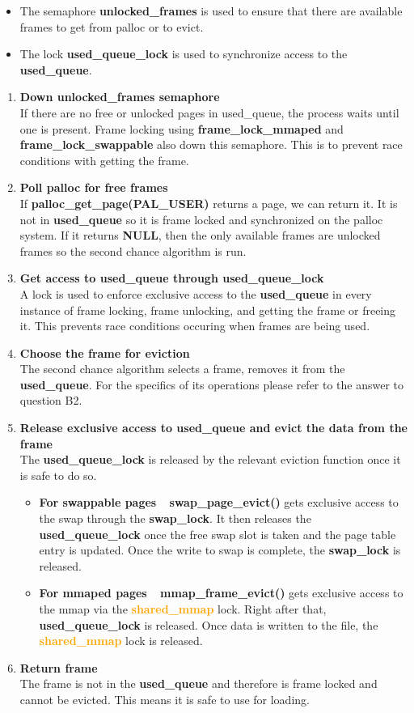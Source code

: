 \documentclass{report}
\newcommand{\bullpara}[2]{\item \textbf{#1} \ #2}
\newcommand{\fun}[1]{\textcolor{Emerald}{\textbf{#1}}}
\newcommand{\struct}[1]{\textcolor{orange}{\textbf{#1}}}
\newcommand{\var}[1]{\textcolor{RoyalPurple}{\textbf{#1}}}
\newcommand{\const}[1]{\textcolor{BrickRed}{\textbf{#1}}}
\newcommand{\compitem}[1]{\begin{itemize}\setlength\itemsep{-0.1em}#1\end{itemize}}
\newcommand{\compenum}[1]{\begin{enumerate}\setlength\itemsep{-0.1em}#1\end{enumerate}}
\begin{document}
				\compitem{
					\item The semaphore \var{unlocked\_frames} is used 
					to ensure that there are available frames to get from 
					palloc or to evict.
					\item The lock \var{used\_queue\_lock} is used to 
					synchronize access to the \var{used\_queue}.
				}
				\compenum {
					\bullpara{Down \var{unlocked\_frames} semaphore}{
						\\ If there are no free or unlocked pages in used\_queue, 
						the process waits until one is present. 
						Frame locking using \fun{frame\_lock\_mmaped} and 
						\fun{frame\_lock\_swappable} also down this semaphore. This is
						to prevent race conditions with getting the frame.
					}
					\bullpara{Poll palloc for free frames}{
						\\ If \fun{palloc\_get\_page(\const{PAL\_USER})} returns
						a page, we can return it. It is not in 
						\var{used\_queue} so it is frame locked and 
						synchronized on the palloc system. If it returns
						\const{NULL}, then the only available frames are unlocked
						frames so the second chance algorithm is run.
					}
					\bullpara{Get access to \var{used\_queue} through \var{used\_queue\_lock}}{
						\\ A lock is used to enforce exclusive access to the 
						\var{used\_queue} in every instance of frame locking,
						frame unlocking, and getting the frame or freeing it. This prevents race 
						conditions occuring when frames are being used.
					}
					\bullpara{Choose the frame for eviction}{
						\\ The second chance algorithm selects a frame,
						removes it from the \var{used\_queue}. For the
						specifics of its operations please refer to the answer
						to question B2.
					}
					\bullpara{Release exclusive access to \var{used\_queue} and evict the data from the frame}{
						\\ The \var{used\_queue\_lock} is released by the relevant eviction function once it is safe to do so.
						\compitem{
							\bullpara{For swappable pages}{
								\fun{swap\_page\_evict()} gets exclusive access to the swap through
								the \var{swap\_lock}. It then releases the \var{used\_queue\_lock} once the free swap slot is
								taken and the page table entry is updated. Once the write to swap
								is complete, the \var{swap\_lock} is released.
							}
							\bullpara{For mmaped pages}{
								\fun{mmap\_frame\_evict()} gets exclusive access to the mmap via the
								\struct{shared\_mmap} lock. Right after that, \var{used\_queue\_lock} is released.
								Once data is written to the file, the \struct{shared\_mmap} lock is released.
							}
						}	
					}
					\bullpara{Return frame}{
						\\ The frame is not in the \var{used\_queue} and therefore
						is frame locked and cannot be evicted.
						This means it is safe to use for loading.
					}
				}
\end{document}
